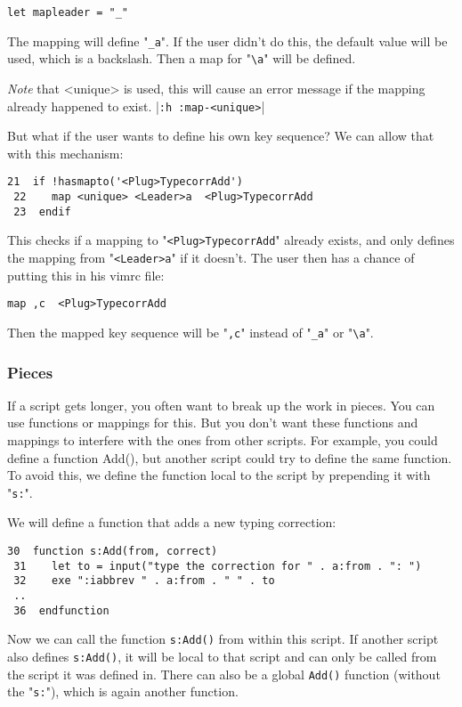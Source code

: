 \begin{Verbatim}[samepage=true]
 let mapleader = "_"
\end{Verbatim}

The mapping will define "\verb!_a!".
If the user didn't do this, the default value will be used, which is a backslash.
Then a map for "\verb!\a!" will be defined.

\emph{Note} that <unique> is used, this will cause an error message if the mapping already happened to exist. |\verb!:h :map-<unique>!|

But what if the user wants to define his own key sequence?
We can allow that with this mechanism:

\begin{Verbatim}[samepage=true]
 21  if !hasmapto('<Plug>TypecorrAdd')
 22    map <unique> <Leader>a  <Plug>TypecorrAdd
 23  endif
\end{Verbatim}

This checks if a mapping to "\verb!<Plug>TypecorrAdd!" already exists, and only defines the mapping from "\verb!<Leader>a!" if it doesn't.
The user then has a chance of putting this in his vimrc file:

\begin{Verbatim}[samepage=true]
 map ,c  <Plug>TypecorrAdd
\end{Verbatim}

Then the mapped key sequence will be "\verb!,c!" instead of "\verb!_a!" or "\verb!\a!".
\subsubsection{Pieces}
If a script gets longer, you often want to break up the work in pieces.
You can use functions or mappings for this.
But you don't want these functions and mappings to interfere with the ones from other scripts.
For example, you could define a function Add(), but another script could try to define the same function.
To avoid this, we define the function local to the script by prepending it with "\verb!s:!".

We will define a function that adds a new typing correction:

\begin{Verbatim}[samepage=true]
 30  function s:Add(from, correct)
 31    let to = input("type the correction for " . a:from . ": ")
 32    exe ":iabbrev " . a:from . " " . to
 ..
 36  endfunction
\end{Verbatim}

Now we can call the function \verb!s:Add()! from within this script.
If another script also defines \verb!s:Add()!, it will be local to that script and can only be called from the script it was defined in.
There can also be a global \verb!Add()!  function (without the "\verb!s:!"), which is again another function.

